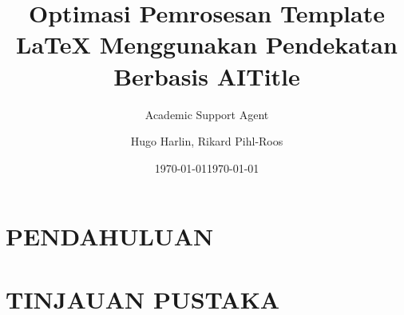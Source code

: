 \documentclass{article}
\title{Optimasi Pemrosesan Template LaTeX Menggunakan Pendekatan Berbasis AI}
\author{Academic Support Agent}
\date{\today}
\begin{document}
\maketitle

\begin{abstract}

\end{abstract}

\chapter{PENDAHULUAN}


\chapter{TINJAUAN PUSTAKA}



\usepackage[swedish]{babel}
\usepackage[utf8]{inputenc}
\usepackage{amsmath}
\usepackage{graphicx}
\usepackage[colorinlistoftodos]{todonotes}
\usepackage[]{mcode}
\usepackage[margin=0.8in]{geometry}
\usepackage{mathtools}
\usepackage{float}
\usepackage{tikz}


\title{Title}

\author{Hugo Harlin, Rikard Pihl-Roos}

\date{\today}
\end{document}

